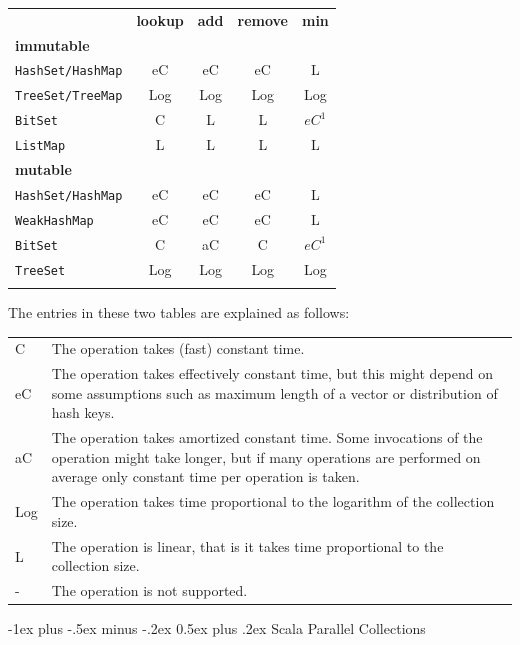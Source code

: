 \documentclass[a4paper,twoside,10pt,landscape]{article}
\makeatletter
\renewcommand{\section}{\@startsection{section}{1}{0mm}%
                                {-1ex plus -.5ex minus -.2ex}%
                                {0.5ex plus .2ex}%
                                {\normalfont\large\bfseries}}
\makeatother
\begin{document}
\begin{multicols}{3}
\begin{center}
\begin{tabular}{@{}lcccc@{}}
\hline\noalign{\smallskip}
 & \textbf{lookup} & \textbf{add} & \textbf{remove} & \textbf{min} \\
\noalign{\smallskip}\hline\noalign{\smallskip}
\textbf{immutable} &&&& \\
\texttt{HashSet/HashMap} & eC & eC & eC & L \\
\texttt{TreeSet/TreeMap} & Log & Log & Log & Log \\
\texttt{BitSet} & C & L & L & $eC^1$ \\
\texttt{ListMap} & L & L & L & L \\
\textbf{mutable} &&&& \\
\texttt{HashSet/HashMap} & eC & eC & eC & L \\
\texttt{WeakHashMap} & eC & eC & eC & L \\
\texttt{BitSet} & C & aC & C & $eC^1$ \\
\texttt{TreeSet} & Log & Log & Log & Log \\
\noalign{\smallskip}\hline
\multicolumn{5}{c}{\small{Footnote 1: Assuming bits are densely packed.}}
\end{tabular}
\end{center}

The entries in these two tables are explained as follows:

\begin{tabular}{@{}lp{7cm}@{}}
C & The operation takes (fast) constant time. \\
eC & The operation takes effectively constant time, but this might depend on some assumptions such as maximum length of a vector or distribution of hash keys. \\
aC & The operation takes amortized constant time. Some invocations of the operation might take longer, but if many operations are performed on average only constant time per operation is taken. \\
Log & The operation takes time proportional to the logarithm of the collection size. \\
L & The operation is linear, that is it takes time proportional to the collection size. \\
- & The operation is not supported.
\end{tabular}


\section{Scala Parallel Collections}



\end{multicols}
\end{document}
